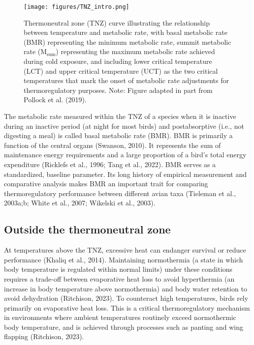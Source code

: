 \documentclass[10pt, twoside]{book} %
\begin{document}
	\renewcommand{\thefigure}{I.\arabic{figure}}
	\begin{figure}[h!]
		\begin{center}
			\texttt{[image: figures/TNZ\_intro.png]}
		\end{center}
		\begin{footnotesize}
			\caption{Thermoneutral zone (TNZ) curve illustrating the relationship between temperature and metabolic rate, with basal metabolic rate (BMR) representing the minimum metabolic rate, summit metabolic rate (M$_{\text{sum}}$) representing the maximum metabolic rate achieved during cold exposure, and including lower critical temperature (LCT) and upper critical temperature (UCT) as the two critical temperatures that mark the onset of metabolic rate adjustments for thermoregulatory purposes. Note: Figure adapted in part from Pollock et al. (2019). \label{figI.1}}
		\end{footnotesize}
	\end{figure}

	The metabolic rate measured within the TNZ of a species when it is inactive during an inactive period (at night for most birds) and postabsorptive (i.e., not digesting a meal) is called basal metabolic rate (BMR). BMR is primarily a function of the central organs (Swanson, 2010). It represents the sum of maintenance energy requirements and a large proportion of a bird's total energy expenditure (Ricklefs et al., 1996; Tang et al., 2022). BMR serves as a standardized, baseline parameter. Its long history of empirical measurement and comparative analysis makes BMR an important trait for comparing thermoregulatory performance between different avian taxa (Tieleman et al., 2003a;b; White et al., 2007; Wikelski et al., 2003). \\

\subsection{Outside the thermoneutral zone}

\noindent At temperatures above the TNZ, excessive heat can endanger survival or reduce performance (Khaliq et al., 2014). Maintaining normothermia (a state in which body temperature is regulated within normal limits) under these conditions requires a trade-off between evaporative heat loss to avoid hyperthermia (an increase in body temperature above normothermia) and body water retention to avoid dehydration (Ritchison, 2023). To counteract high temperatures, birds rely primarily on evaporative heat loss. This is a critical thermoregulatory mechanism in environments where ambient temperatures routinely exceed normothermic body temperature, and is achieved through processes such as panting and wing flapping (Ritchison, 2023).\\
\end{document}
